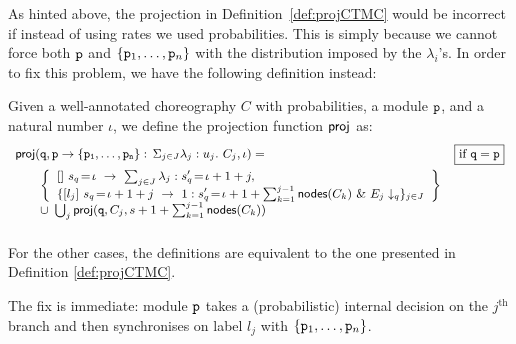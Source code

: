    As hinted above, the projection in Definition~\ref{def:projCTMC}
    would be incorrect if instead of using rates we used
    probabilities. This is simply because we cannot force both
    $\mathtt{p}$ and $\{\mathtt{p}_1,\ldots,\mathtt{p}_n\}$ with the
    distribution imposed by the $\lambda_i$'s. In order to fix this
    problem, we have the following definition instead:
    \begin{definition}\label{def:projDTMC} Given a well-annotated
      choreography $C$ with probabilities, a module $\mathtt{p}$, and a
      natural number $\iota$, we define the projection function
      $\mathsf{proj}$ as:
      \begin{displaymath}\small
        \begin{array}{lr}

          \proj (\role q,\interact{p}{\role p_1,\ldots,\role p_n}, \iota)= 
          &  \boxed{\text{if }\role q=\role p}\\[2mm]
          \qquad
          \left\{
          \begin{array}{lll}
            \commandBase {} {s_{q}\!=\! \iota}{\ \sum_{j\in J} \lambda_j: s'_{q}\!=\! \iota+1+j},\\ 
            \{\commandBase {l_j} {s_{q}\!=\! \iota+1+j}
            \ 1: s'_{q}\!=\! \iota+1+\sum_{k=1}^{j-1}\mathsf{nodes}({C_k})\ \&\ \projE
            {E_j}q\}_{j\in J}
          \end{array}
          \right\}
          \\
          \qquad\cup\ \bigcup_{j} \proj (\role q, C_j, s+1+\sum_{k=1}^{j-1}\mathsf{nodes}({C_k}))
          \\\\

        \end{array}
      \end{displaymath}
      For the other cases, the definitions are equivalent to the one
      presented in Definition \ref{def:projCTMC}.
    \end{definition}
    The fix is immediate: module $\mathtt{p}$ takes a (probabilistic)
    internal decision on the $j^{\text{th}}$ branch and then
    synchronises on label $l_j$ with $\{\mathtt{p}_1,\ldots,\mathtt{p}_n\}$.       


